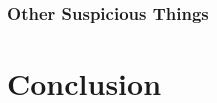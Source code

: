 \documentclass[
	letterpaper, %
	10pt, %
	unnumberedsections, %
	twoside, %
]{APAAssignment}
\begin{document}
\subsubsection{Other Suspicious Things}



\section{Conclusion}





\clearpage
\printbibliography %




%


\clearpage
\end{document}
